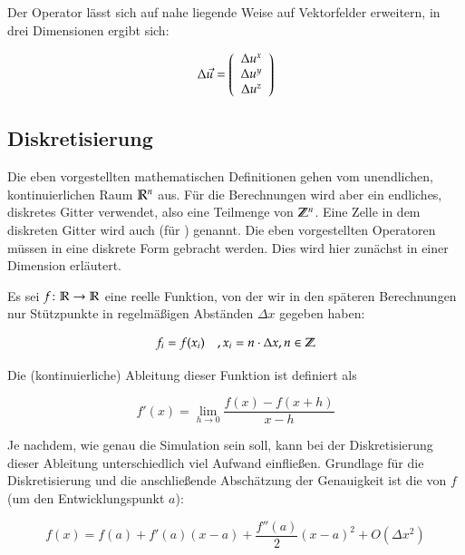 Der Operator lässt sich auf nahe liegende Weise auf Vektorfelder erweitern, in drei Dimensionen
ergibt sich:

\begin{equation}
\Delta \vec{u} =
\left(
	\begin{array}{c}
		\Delta u^x \\
		\Delta u^y \\
		\Delta u^z
	\end{array}
\right)
\end{equation}

\subsection{Diskretisierung}
\label{sec:mathematics_discretization}

Die eben vorgestellten mathematischen Definitionen gehen vom
unendlichen, kontinuierlichen Raum $\mathbb{R}^n$ aus. Für die
Berechnungen wird aber ein endliches, diskretes Gitter verwendet, also
eine Teilmenge von $\mathbb{Z}^n$. Eine Zelle in dem diskreten
Gitter wird auch  (für
) genannt. Die eben vorgestellten
Operatoren müssen in eine diskrete Form gebracht werden. Dies wird
hier zunächst in einer Dimension erläutert.

Es sei $f \colon \mathbb{R} \to \mathbb{R}$ eine reelle Funktion, von der
wir in den späteren Berechnungen nur Stützpunkte in regelmäßigen Abständen
$\Delta x$ gegeben haben:

\begin{equation}
f_i = f(x_i) \quad , x_i = n \cdot \Delta x, n \in \mathbb{Z}
\end{equation}

Die (kontinuierliche) Ableitung dieser Funktion ist definiert als

\begin{equation}
f'(x) = \lim_{h \to 0} \frac{f(x) - f(x+h)}{x - h}
\end{equation}

Je nachdem, wie genau die Simulation sein soll, kann bei der
Diskretisierung dieser Ableitung unterschiedlich viel Aufwand
einfließen. Grundlage für die Diskretisierung und die anschließende
Abschätzung der Genauigkeit ist die  von
$f$ (um den Entwicklungspunkt $a$):

\begin{equation}
f(x) = f(a) + f'(a)(x-a) + \frac{f''(a)}{2}(x-a)^2 + O(\Delta x^2)
\end{equation}

